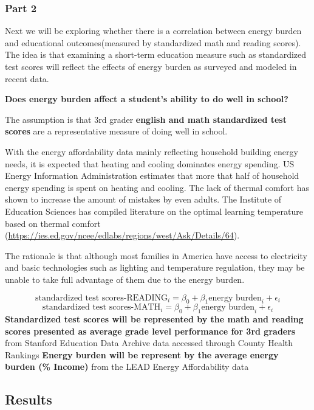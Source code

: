 \documentclass[
]{article}
\begin{document}
\hypertarget{part-2}{%
\subsubsection{Part 2}\label{part-2}}

Next we will be exploring whether there is a correlation between energy
burden and educational outcomes(measured by standardized math and
reading scores). The idea is that examining a short-term education
measure such as standardized test scores will reflect the effects of
energy burden as surveyed and modeled in recent data.

\textbf{Does energy burden affect a student's ability to do well in
school?}

The assumption is that 3rd grader \textbf{english and math standardized
test scores} are a representative measure of doing well in school.

With the energy affordability data mainly reflecting household building
energy needs, it is expected that heating and cooling dominates energy
spending. US Energy Information Administration estimates that more that
half of household energy spending is spent on heating and cooling. The
lack of thermal comfort has shown to increase the amount of mistakes by
even adults. The Institute of Education Sciences has compiled literature
on the optimal learning temperature based on thermal comfort
(\url{https://ies.ed.gov/ncee/edlabs/regions/west/Ask/Details/64}).

The rationale is that although most families in America have access to
electricity and basic technologies such as lighting and temperature
regulation, they may be unable to take full advantage of them due to the
energy burden.

\[\text{standardized test scores-READING}_i = \beta_0 + \beta_1 \text{energy burden}_i + \epsilon_i\]
\[\text{standardized test scores-MATH}_i = \beta_0 + \beta_1 \text{energy burden}_i + \epsilon_i\]
\textbf{Standardized test scores will be represented by the math and
reading scores presented as average grade level performance for 3rd
graders} from Stanford Education Data Archive data accessed through
County Health Rankings \textbf{Energy burden will be represent by the
average energy burden (\% Income)} from the LEAD Energy Affordability
data

\hypertarget{results}{%
\subsection{Results}\label{results}}
\end{document}
